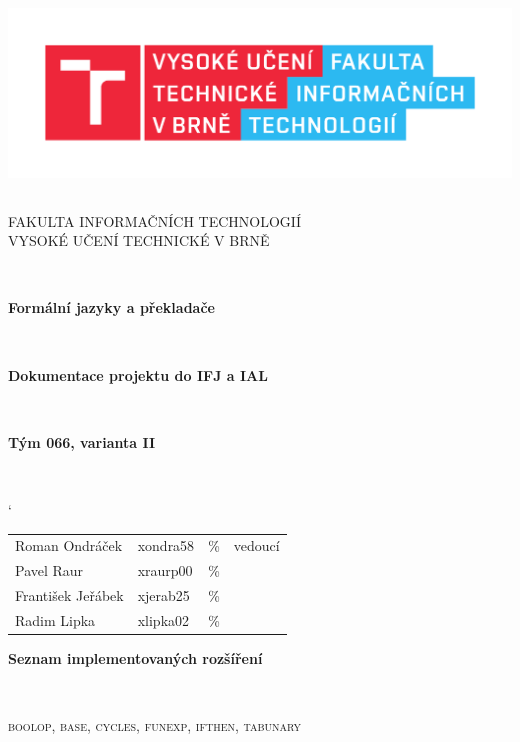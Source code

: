 \documentclass[12pt]{article}
\begin{document}
\begin{titlepage}
	\begin{center}

		\includegraphics[height = 150pt]{img/FIT_barevne_CMYK_CZ.pdf} \\

		\begin{LARGE}
			\textsc{FAKULTA INFORMAČNÍCH TECHNOLOGIÍ} \\
			\textsc{VYSOKÉ UČENÍ TECHNICKÉ V BRNĚ}
		\end{LARGE}
		\\[5mm]
		
		\begin{LARGE}
			\textbf{Formální jazyky a překladače} 
		\end{LARGE}
        \\[20mm]
		\begin{Large}
				\textbf{Dokumentace projektu do IFJ a IAL} 
		\end{Large}
		\\[20mm]
		\begin{Large}
				\textbf{Tým 066, varianta II} 
		\end{Large}
		\\[20mm]
\begin{table}[h]
\centering
\begin{large}	
\catcode`
    \begin{tabular}{l l l l}
         Roman Ondráček & xondra58 & \% & vedoucí\\
         Pavel Raur & xraurp00 & \% &\\
         František Jeřábek & xjerab25 & \% &\\
         Radim Lipka & xlipka02 & \% & 
    \end{tabular}
\end{large}
\end{table}
\vfill
\begin{Large}
				\textbf{Seznam implementovaných rozšíření}
\end{Large}
\\[5mm]
\begin{Large}
			    \textsc{boolop, base, cycles, funexp, ifthen, tabunary} 
\end{Large}
\end{center}
\end{titlepage}
\end{document}
